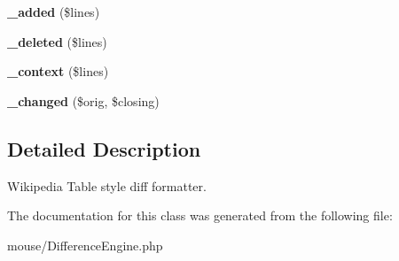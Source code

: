 \begin{CompactItemize}
\item 
\hypertarget{classTableDiffFormatter_b01c1599efec8d2e20e33d11b6517b17}{
\textbf{\_\-added} (\$lines)}
\label{classTableDiffFormatter_b01c1599efec8d2e20e33d11b6517b17}

\item 
\hypertarget{classTableDiffFormatter_630261c7a6bc04d1477559a86cc6dd34}{
\textbf{\_\-deleted} (\$lines)}
\label{classTableDiffFormatter_630261c7a6bc04d1477559a86cc6dd34}

\item 
\hypertarget{classTableDiffFormatter_b27fbe988e37f18a9ea0bdad2baf4695}{
\textbf{\_\-context} (\$lines)}
\label{classTableDiffFormatter_b27fbe988e37f18a9ea0bdad2baf4695}

\item 
\hypertarget{classTableDiffFormatter_57fc37d0b78fff4e3cd6b8482aa6850e}{
\textbf{\_\-changed} (\$orig, \$closing)}
\label{classTableDiffFormatter_57fc37d0b78fff4e3cd6b8482aa6850e}

\end{CompactItemize}


\subsection{Detailed Description}
Wikipedia Table style diff formatter. 

The documentation for this class was generated from the following file:\begin{CompactItemize}
\item 
mouse/DifferenceEngine.php\end{CompactItemize}
